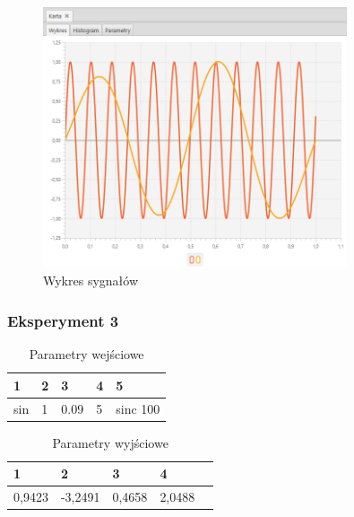 \documentclass[12pt]{article}
\begin{document}
{{{                \begin{figure}[H]
                    \centering
                    \includegraphics[width=0.8\textwidth]{img/result/experiment3/02/data_draw_original_chart_recon_output_200358.png}
                    \caption{Wykres sygnałów}
                \end{figure}
            }
            \newpage

            \subsubsection{Eksperyment 3} {
                \begin{table}[H]
                    \centering
                    \begin{tabular}{|l|l|l|l|l|}
                        \hline
                        1 & 2 & 3 & 4 & 5   \\ \hline
                        sin & 1 & 0.09 & 5 & sinc 100   \\ \hline
                    \end{tabular}
                    \caption{Parametry wejściowe}
                \end{table}

                \begin{table}[H]
                    \centering
                    \begin{tabular}{|l|l|l|l|l|}
                        \hline
                        1 & 2 & 3 & 4   \\ \hline
                        0,9423 & -3,2491 & 0,4658 & 2,0488 \\ \hline
                    \end{tabular}
                    \caption{Parametry wyjściowe}
                \end{table}


}}}
\end{document}
